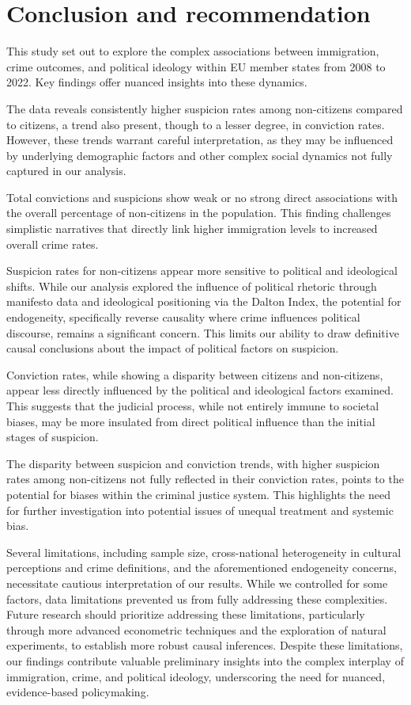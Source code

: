 \documentclass[
]{article}
\begin{document}
\section{Conclusion and
recommendation}\label{conclusion-and-recommendation}

This study set out to explore the complex associations between
immigration, crime outcomes, and political ideology within EU member
states from 2008 to 2022. Key findings offer nuanced insights into these
dynamics.

The data reveals consistently higher suspicion rates among non-citizens
compared to citizens, a trend also present, though to a lesser degree,
in conviction rates. However, these trends warrant careful
interpretation, as they may be influenced by underlying demographic
factors and other complex social dynamics not fully captured in our
analysis.

Total convictions and suspicions show weak or no strong direct
associations with the overall percentage of non-citizens in the
population. This finding challenges simplistic narratives that directly
link higher immigration levels to increased overall crime rates.

Suspicion rates for non-citizens appear more sensitive to political and
ideological shifts. While our analysis explored the influence of
political rhetoric through manifesto data and ideological positioning
via the Dalton Index, the potential for endogeneity, specifically
reverse causality where crime influences political discourse, remains a
significant concern. This limits our ability to draw definitive causal
conclusions about the impact of political factors on suspicion.

Conviction rates, while showing a disparity between citizens and
non-citizens, appear less directly influenced by the political and
ideological factors examined. This suggests that the judicial process,
while not entirely immune to societal biases, may be more insulated from
direct political influence than the initial stages of suspicion.

The disparity between suspicion and conviction trends, with higher
suspicion rates among non-citizens not fully reflected in their
conviction rates, points to the potential for biases within the criminal
justice system. This highlights the need for further investigation into
potential issues of unequal treatment and systemic bias.

Several limitations, including sample size, cross-national heterogeneity
in cultural perceptions and crime definitions, and the aforementioned
endogeneity concerns, necessitate cautious interpretation of our
results. While we controlled for some factors, data limitations
prevented us from fully addressing these complexities. Future research
should prioritize addressing these limitations, particularly through
more advanced econometric techniques and the exploration of natural
experiments, to establish more robust causal inferences. Despite these
limitations, our findings contribute valuable preliminary insights into
the complex interplay of immigration, crime, and political ideology,
underscoring the need for nuanced, evidence-based policymaking.
\end{document}
